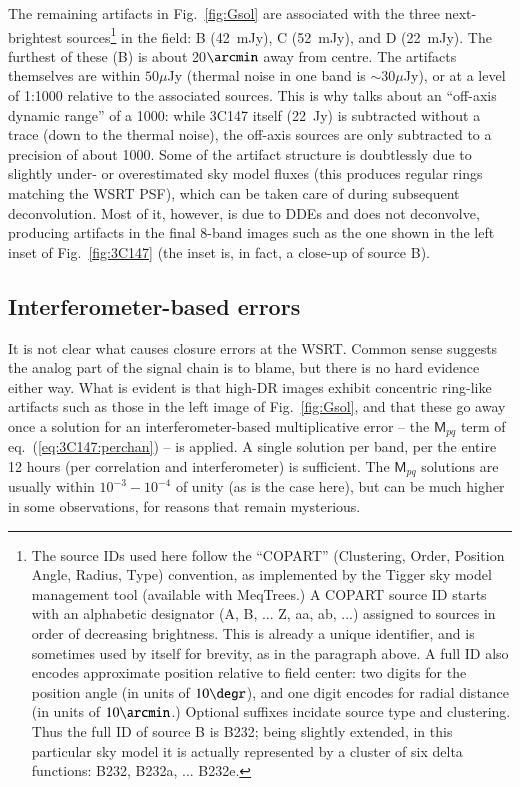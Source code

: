 \documentclass[]{aa}
\newcommand{\coh}[2]{\mathsf{{#1}}_{{#2}}}
\begin{document}
The remaining artifacts in Fig.~\ref{fig:Gsol} are associated with the three next-brightest sources\footnote{The source IDs used here follow the ``COPART'' (Clustering, Order, Position Angle, Radius, Type) convention, as implemented by the Tigger sky model management tool (available with MeqTrees.) A COPART source ID starts with an alphabetic designator (A, B, ... Z, aa, ab, ...) assigned to sources in order of decreasing brightness. This is already a unique identifier, and is sometimes used by itself for brevity, as in the paragraph above. A full ID also encodes approximate position relative to field center: two digits for the position angle (in units of $10\degr$), and one digit encodes for radial distance (in units of $10\arcmin$.) Optional suffixes incidate source type and clustering. Thus the full ID of source B is B232; being slightly extended, in this particular sky model it is actually represented by a cluster of six delta functions: B232, B232a, ... B232e.} in 
the field: B (42~mJy), C (52~mJy), and D (22~mJy). The furthest of these (B) is about 20$\arcmin$ away from centre. The artifacts themselves are within $50 \mu$Jy (thermal noise in one band is $\sim 30 \mu$Jy), or at a level of 1:1000 relative to the associated sources. This is why \citet{deBruyn:million} talks about an ``off-axis dynamic range'' of a 1000: while 3C147 itself (22~Jy) is subtracted without a trace (down to the thermal noise), the off-axis sources are only subtracted to a precision of about 1000. Some of the artifact structure is doubtlessly due to slightly under- or overestimated sky model fluxes (this produces regular rings matching the WSRT PSF), which can be taken care of during subsequent deconvolution. Most of it, however, is due to DDEs and does not deconvolve, producing artifacts in the final 8-band images such as the one shown in the left inset of Fig.~\ref{fig:3C147} (the inset is, in fact, a close-up of source B).

\subsection{Interferometer-based errors\label{sec:3C147:closure-errors}}

It is not clear what causes closure errors at the WSRT. Common sense suggests the analog part of the signal chain is to blame, but there is no hard evidence either way. What is evident is that high-DR images exhibit concentric ring-like artifacts such as those in the left image of Fig.~\ref{fig:Gsol}, and that these go away once a solution for an interferometer-based  multiplicative error -- the $\coh{M}{pq}$ term of eq.~(\ref{eq:3C147:perchan}) -- is applied. A single solution per band, per the entire 12 hours (per correlation and interferometer) is sufficient. The $\coh{M}{pq}$ solutions are usually within $10^{-3}-10^{-4}$ of unity (as is the case here), but can be much higher in some observations, for reasons that remain mysterious. 
\end{document}
